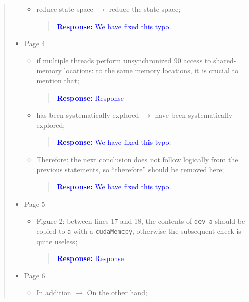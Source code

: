 \documentclass[11pt]{article}
\begin{document}
\begin{quote}
\begin{itemize}
\begin{itemize}
  \item reduce state space $\rightarrow$ reduce the state space;
  
    \begin{quote}
    \textcolor{blue}{\textbf{Response:} We have fixed this typo.}
    \end{quote}

  \end{itemize}
\item Page 4
  \begin{itemize}
  \item if multiple threads perform unsynchronized 90 access to shared-memory locations: to the same memory locations, it is crucial to mention that;
  
    \begin{quote}
    \textcolor{blue}{\textbf{Response:} Response}
    \end{quote}

  \item has been systematically explored $\rightarrow$ have been systematically explored;
  
    \begin{quote}
    \textcolor{blue}{\textbf{Response:} We have fixed this typo.}
    \end{quote}

  \item Therefore: the next conclusion does not follow logically from the previous statements, so ``therefore'' should be removed here;
  
    \begin{quote}
    \textcolor{blue}{\textbf{Response:} We have fixed this typo.}
    \end{quote}

  \end{itemize}
\item Page 5
  \begin{itemize}
  \item Figure 2: between lines 17 and 18, the contents of {\tt dev\_a} should be copied to {\tt a} with a {\tt cudaMemcpy}, otherwise the subsequent check is quite useless;
  
    \begin{quote}
    \textcolor{blue}{\textbf{Response:} Response}
    \end{quote}

  \end{itemize}
\item Page 6
  \begin{itemize}
  \item In addition $\rightarrow$ On the other hand;
  

\end{itemize}
\end{itemize}
\end{quote}
\end{document}
